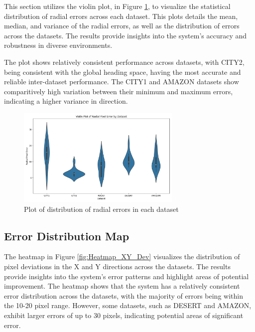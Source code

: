This section utilizes the violin plot, in Figure \ref{fig:Violin Dataset Plot}, to visualize the statistical distribution of radial errors across each dataset. This plots details the mean, median, and variance of the radial errors, as well as the distribution of errors across the datasets. The results provide insights into the system's accuracy and robustness in diverse environments. 

The plot shows relatively consistent performance across datasets, with CITY2, being consistent with the global heading space, having the most accurate and reliable inter-dataset performance. The CITY1 and AMAZON datasets show comparitively high variation between their minimum and maximum errors, indicating a higher variance in direction.

\begin{figure}[H]
    \centering
    \includegraphics[width=0.7\textwidth]{Chapter 5/RESULTPLOTS/violindatasets.png}
    \caption{Plot of distribution of radial errors in each dataset}
    \label{fig:Violin Dataset Plot}
\end{figure}



\subsection{Error Distribution Map}

The heatmap in Figure \ref{fig:Heatmap_XY_Dev} visualizes the distribution of pixel deviations in the X and Y directions across the datasets. The results provide insights into the system's error patterns and highlight areas of potential improvement. The heatmap shows that the system has a relatively consistent error distribution across the datasets, with the majority of errors being within the 10-20 pixel range. However, some datasets, such as DESERT and AMAZON, exhibit larger errors of up to 30 pixels, indicating potential areas of significant error. 

